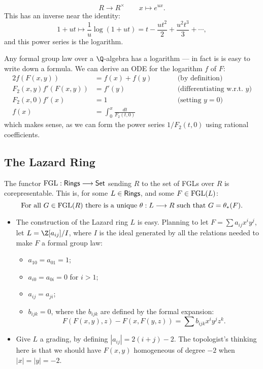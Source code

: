 \documentclass[11pt]{article}
\begin{document}
\begin{Formal Group Laws}
\begin{itemise}
\begin{itemize}
\[R\to R^\times\qquad x\mapsto e^{ux}.\]
This has an inverse near the identity:
\[1+ut\mapsto\frac{1}{u}\log(1+ut)=t-\frac{ut^2}{2}+\frac{u^2t^3}{3}+\cdots,\]
and this power series is the logarithm.
\end{itemize}
Any formal group law over a $\Q$-algebra has a logarithm --- in fact is is easy to write down a formula. We can derive an ODE for the logarithm $f$ of $F$:
\begin{alignat*}{2}
f(F(x,y))&=
f(x)+f(y)%
&\qquad&\text{(by definition)}\\
F_{2}(x,y)f'(F(x,y))&=
f'(y)%
&\qquad&\text{(differentiating w.r.t.\ $y$)} \\
F_2(x,0)f'(x)&=
1%
&\qquad&\text{(setting $y=0$)} \\
f(x)&=
\int_0^x\frac{dt}{F_2(t,0)}%
 \end{alignat*}
which makes sense, as we can form the power series $1/F_2(t,0)$ using rational coefficients.

\end{itemise}
\subsection*{The Lazard Ring}
\begin{itemise}
\renewcommand{\labelitemii}{$\rightarrow$}
\item The functor $\textup{FGL}:\textsf{Rings}\longrightarrow\operatorname{{\mathsf{Set}}}$ sending $R$ to the set of FGLs over $R$ is corepresentable. This is, for some $L\in\textsf{Rings}$, and some $F\in\textup{FGL}(L)$:%
\[\textup{For all $G\in\textup{FGL}(R)$ there is a unique }\theta:L\longrightarrow R\textup{ such that }G=\theta_*(F).\]
\begin{itemize}\squishlist
\item The construction of the Lazard ring $L$ is easy. Planning to let $F=\sum a_{ij}x^iy^j$, let $L=\Z[a_{ij}]/I$, where $I$ is the ideal generated by all the relations needed to make $F$ a formal group law:
\begin{itemize}\squishlist
\item $a_{10}=a_{01}=1$;%
\item $a_{i0}=a_{0i}=0$ for $i>1$;
\item $a_{ij}=a_{ji}$;%
\item $b_{ijk}=0$, where the $b_{ijk}$ are defined by the formal expansion:
\[F(F(x,y),z)-F(x,F(y,z))=\sum b_{ijk}x^iy^jz^k.\]
\end{itemize}
\item Give $L$ a grading, by defining $|a_{ij}|=2(i+j)-2$. The topologist's thinking here is that we should have $F(x,y)$ homogeneous of degree $-2$ when $|x|=|y|=-2$.
\end{itemize}
\end{itemise}

\end{Formal Group Laws}
\end{document}
